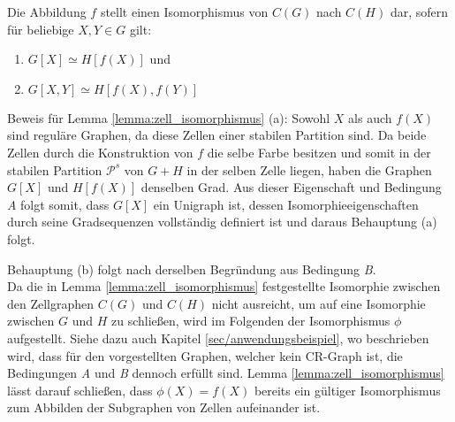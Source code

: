 \begin{Lemma}
	Die Abbildung $f$ stellt einen Isomorphismus von $C(G)$ nach $C(H)$ dar, sofern für beliebige $X,Y\in G$ gilt:
	\begin{enumerate}[label=(\alph*)]
		\item $G[X]\simeq H[f(X)]$ und
		\item $G[X,Y]\simeq H[f(X),f(Y)]$
	\end{enumerate}
	\label{lemma:zell_isomorphismus}
\end{Lemma}

Beweis für Lemma \ref{lemma:zell_isomorphismus} (a):
Sowohl $X$ als auch $f(X)$ sind reguläre Graphen, da diese Zellen einer stabilen Partition sind.
Da beide Zellen durch die Konstruktion von $f$ die selbe Farbe besitzen und somit in der stabilen Partition $\mathcal{P}^s$ von $G+H$ in der selben Zelle liegen, haben die Graphen $G[X]$ und $H[f(X)]$ denselben Grad.
Aus dieser Eigenschaft und Bedingung \emph{A} folgt somit, dass $G[X]$ ein Unigraph ist, dessen Isomorphieeigenschaften durch seine Gradsequenzen vollständig definiert ist und daraus Behauptung (a) folgt.

Behauptung (b) folgt nach derselben Begründung aus Bedingung \emph{B}.\\

Da die in Lemma \ref{lemma:zell_isomorphismus} festgestellte Isomorphie zwischen den Zellgraphen $C(G)$ und $C(H)$ nicht ausreicht, um auf eine Isomorphie zwischen $G$ und $H$ zu schließen, wird im Folgenden der Isomorphismus $\phi $ aufgestellt.
Siehe dazu auch Kapitel \ref{sec/anwendungsbeispiel}, wo beschrieben wird, dass für den vorgestellten Graphen, welcher kein CR-Graph ist, die Bedingungen \emph{A} und \emph{B} dennoch erfüllt sind.
Lemma \ref{lemma:zell_isomorphismus} lässt darauf schließen, dass $\phi (X)=f(X)$ bereits ein gültiger Isomorphismus zum Abbilden der Subgraphen von Zellen aufeinander ist.

